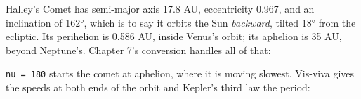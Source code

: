 \documentclass[
  10.5pt,
  letterpaper,
]{scrbook}
\newenvironment{Shaded}{\begin{snugshade}}{\end{snugshade}}
\newcommand{\AttributeTok}[1]{\textcolor[rgb]{0.00,0.00,0.00}{#1}}
\newcommand{\DecValTok}[1]{\textcolor[rgb]{0.00,0.00,0.00}{#1}}
\newcommand{\FloatTok}[1]{\textcolor[rgb]{0.00,0.00,0.00}{#1}}
\newcommand{\FunctionTok}[1]{\textcolor[rgb]{0.00,0.00,0.00}{#1}}
\newcommand{\NormalTok}[1]{\textcolor[rgb]{0.00,0.00,0.00}{#1}}
\newcommand{\OtherTok}[1]{\textcolor[rgb]{0.00,0.00,0.00}{#1}}
\newcommand{\SpecialCharTok}[1]{\textcolor[rgb]{0.00,0.00,0.00}{#1}}
\newcommand{\StringTok}[1]{\textcolor[rgb]{0.00,0.00,0.00}{#1}}
\theoremstyle{plain}
\theoremstyle{remark}
\begin{document}
Halley's Comet has semi-major axis 17.8 AU, eccentricity 0.967, and an
inclination of 162°, which is to say it orbits the Sun \emph{backward},
tilted 18° from the ecliptic. Its perihelion is 0.586 AU, inside Venus's
orbit; its aphelion is 35 AU, beyond Neptune's. Chapter 7's conversion
handles all of that:

\begin{Shaded}
\end{Shaded}

\texttt{nu\ =\ 180} starts the comet at aphelion, where it is moving
slowest. Vis-viva gives the speeds at both ends of the orbit and
Kepler's third law the period:
\end{document}
